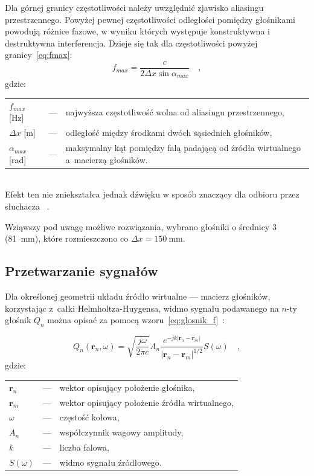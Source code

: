 \documentclass[12pt]{oska}
\let\Oldsubsection\subsection
\renewcommand{\subsection}{\FloatBarrier\Oldsubsection}
\begin{document}
Dla górnej granicy częstotliwości należy uwzględnić zjawisko aliasingu
przestrzennego. Powyżej pewnej częstotliwości odległości pomiędzy głośnikami
powodują różnice fazowe, w wyniku których występuje konstruktywna i
destruktywna interferencja. Dzieje się tak dla częstotliwości powyżej
granicy~\eqref{eq:fmax}:
\begin{equation}
  f_{max}=\frac{c}{2\Delta x \sin{\alpha_{max}}} \quad, \label{eq:fmax}
\end{equation}
gdzie:\\
\indent \begin{tabular}{l c p{}}
  $f_{max}$ [\si{\hertz}] & --- & najwyższa częstotliwość wolna od aliasingu przestrzennego, \\
  $\Delta x$ [\si{\metre}] & --- & odległość między środkami dwóch sąsiednich głośników, \\
  $\alpha_{max}$ [\si{\radian}] & --- & maksymalny kąt pomiędzy falą padającą od źródła wirtualnego a~macierzą głośników.\\
\end{tabular}\\

\noindent Efekt ten nie zniekształca jednak dźwięku w sposób znaczący dla odbioru przez słuchacza
~\cite{hq_rendering}.

Wziąwszy pod uwagę możliwe rozwiązania, wybrano głośniki o średnicy \SI{3}{\inch}
(\SI{81}{\milli\meter}), które rozmieszczono co
$\Delta x=\SI{150}{\milli\meter}$.

\subsection{Przetwarzanie sygnałów}\label{s:algorithm}

Dla określonej geometrii układu źródło wirtualne --- macierz głośników,
korzystając z~całki Helmholtza-Huygensa, widmo sygnału podawanego na $n$-ty
głośnik $Q_n$ można opisać za pomocą wzoru~\eqref{eq:glosnik_f}~\cite{delay}:

\begin{equation}
  Q_n(\bm{r}_n,\omega) = \sqrt{\frac{j\omega}{2\pi c}} A_n \frac {e^{-jk|\bm{r}_n-\bm{r}_m|}}{|\bm{r}_n-\bm{r}_m|^{1/2}} S(\omega) \quad,
  \label{eq:glosnik_f}
\end{equation}
gdzie:\\
\indent \begin{tabular}{l c p{}}
  $\bm{r}_n$ & --- & wektor opisujący położenie głośnika, \\
  $\bm{r}_m$ & --- & wektor opisujący położenie źródła wirtualnego,\\
  $\omega$ & --- & częstość kołowa, \\
  $A_n$ & --- & współczynnik wagowy amplitudy,\\
  $k$ & --- & liczba falowa,\\
  $S(\omega)$ & --- & widmo sygnału źródłowego.
\end{tabular}\\
\end{document}
